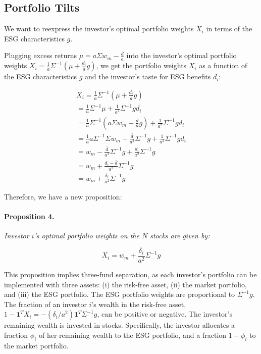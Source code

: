 \subsection{Portfolio Tilts}

We want to reexpress the 
investor's optimal portfolio weights $X_i$ in terms of 
the ESG characteristics $g$.

Plugging excess returns $\mu = a \Sigma w_m - \frac{\bar{d}}{a}$ 
into the investor's optimal portfolio weights $X_i = \frac{1}{a} \Sigma^{-1}(\mu + \frac{d_i}{a}g)$,
we get
the portfolio weights $X_i$ as a function of the ESG characteristics $g$ and the investor's
taste for ESG benefits $d_i$:

\begin{equation}
    \begin{aligned}
    X_i = \frac{1}{a} \Sigma^{-1}(\mu + \frac{d_i}{a}g) \\
     = \frac{1}{a} \Sigma^{-1}\mu + \frac{1}{a^2} \Sigma^{-1} g d_i \\
     = \frac{1}{a} \Sigma^{-1} (a \Sigma w_m - \frac{\bar{d}}{a} g) + \frac{1}{a^2} \Sigma^{-1} g d_i \\
     = \frac{1}{a}a\Sigma^{-1}\Sigma w_m - \frac{\bar{d}}{a^2} \Sigma^{-1} g + \frac{1}{a^2} \Sigma^{-1} g d_i \\
     = w_m - \frac{\bar{d}}{a^2} \Sigma^{-1} g + \frac{d_i}{a^2} \Sigma^{-1} g \\
        = w_m + \frac{d_i - \bar{d}}{a^2} \Sigma^{-1} g \\
    = w_m + \frac{\delta_i}{a^2} \Sigma^{-1} g
    \end{aligned}
\end{equation}

Therefore, we have a new proposition:

\paragraph{Proposition 4.} \textit{Investor $i$'s 
optimal portfolio weights on the $N$ stocks are given by:}

\begin{equation}
    X_i = w_m + \frac{\delta_i}{a^2} \Sigma^{-1} g
\end{equation}

This proposition implies three-fund separation, 
as each investor's portfolio can be implemented with three 
assets: (i) the risk-free asset, 
(ii) the market portfolio, and (iii) the ESG portfolio.
The ESG portfolio weights are proportional 
to $\Sigma^{-1} g$. 
The fraction of an investor $i$'s wealth in 
the risk-free asset, $1 - \mathbf{1}^T X_i = - (\delta_i/a^2)\mathbf{1}^T \Sigma^{-1}g$, 
can be positive or negative. 
The investor's remaining wealth is invested 
in stocks. Specifically, 
the investor allocates a fraction $\phi_i$ 
of her remaining wealth to the ESG portfolio,
and a fraction $1 - \phi_i$ to the market portfolio.

